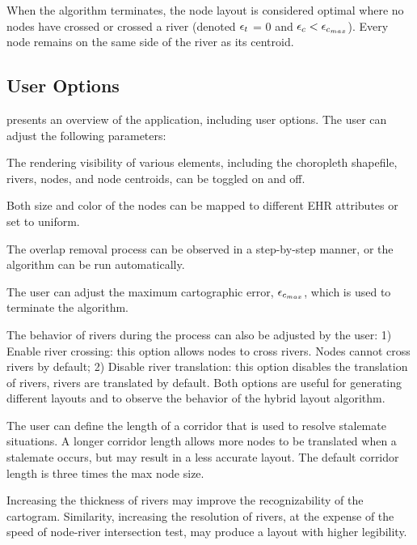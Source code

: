 When the algorithm terminates, the node layout is considered optimal where no nodes have crossed or crossed a river (denoted $ \epsilon_{t} $ = 0 and $ \epsilon_{c} < \epsilon_{c_{max}} $). Every node remains on the same side of the river as its centroid.

\subsection{User Options}

 presents an overview of the application, including user options. The user can adjust the following parameters:

 The rendering visibility of various elements, including the choropleth shapefile, rivers, nodes, and node centroids, can be toggled on and off.

 Both size and color of the nodes can be mapped to different EHR attributes or set to uniform.

 The overlap removal process can be observed in a step-by-step manner, or the algorithm can be run automatically. 

 The user can adjust the maximum cartographic error, $ \epsilon_{c_{max}} $, which is used to terminate the algorithm.

 The behavior of rivers during the process can also be adjusted by the user: 1) Enable river crossing: this option allows nodes to cross rivers. Nodes cannot cross rivers by default; 2) Disable river translation: this option disables the translation of rivers, rivers are translated by default. Both options are useful for generating different layouts and to observe the behavior of the hybrid layout algorithm.

 The user can define the length of a corridor that is used to resolve stalemate situations. A longer corridor length allows more nodes to be translated when a stalemate occurs, but may result in a less accurate layout. The default corridor length is three times the max node size.

 Increasing the thickness of rivers may improve the recognizability of the cartogram. Similarity, increasing the resolution of rivers, at the expense of the speed of node-river intersection test, may produce a layout with higher legibility.

